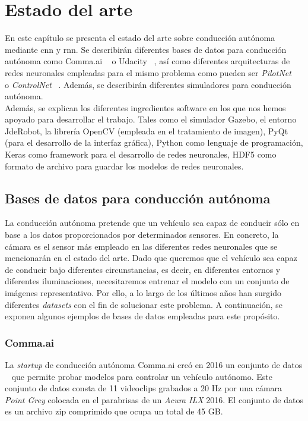 \chapter{Estado del arte}\label{cap.estado}

En este capítulo se presenta el estado del arte sobre conducción autónoma mediante \acrfull{cnn} y \acrfull{rnn}. Se describirán diferentes bases de datos para conducción autónoma como Comma.ai ~\cite{comma} o Udacity ~\cite{udacity-data}, así como diferentes arquitecturas de redes neuronales empleadas para el mismo problema como pueden ser \textit{PilotNet} ~\cite{explaining-end2end} o \textit{ControlNet} ~\cite{reactive-ground}. Además, se describirán diferentes simuladores para conducción autónoma.\\

Además, se explican los diferentes ingredientes software en los que nos hemos apoyado para desarrollar el trabajo. Tales como el simulador Gazebo, el entorno JdeRobot, la librería OpenCV (empleada en el tratamiento de imagen), PyQt (para el desarrollo de la interfaz gráfica), Python como lenguaje de programación, Keras como framework para el desarrollo de redes neuronales, HDF5 como formato de archivo para guardar los modelos de redes neuronales.\\


\section{Bases de datos para conducción autónoma}

La conducción autónoma pretende que un vehículo sea capaz de conducir sólo en base a los datos proporcionados por determinados sensores. En concreto, la cámara es el sensor más empleado en las diferentes redes neuronales que se mencionarán en el estado del arte. Dado que queremos que el vehículo sea capaz de conducir bajo diferentes circunstancias, es decir, en diferentes entornos y diferentes iluminaciones, necesitaremos entrenar el modelo con un conjunto de imágenes representativo. Por ello, a lo largo de los últimos años han surgido diferentes \textit{datasets} con el fin de solucionar este problema. A continuación, se exponen algunos ejemplos de bases de datos empleadas para este propósito.

\subsection{Comma.ai}

La \textit{startup} de conducción autónoma Comma.ai creó en 2016 un conjunto de datos ~\cite{comma} que permite probar modelos para controlar un vehículo autónomo. Este conjunto de datos consta de 11 videoclips grabados a 20 Hz por una cámara \textit{Point Grey} colocada en el parabrisas de un \textit{Acura ILX} 2016. El conjunto de datos es un archivo zip comprimido que ocupa un total de 45 GB.\\

